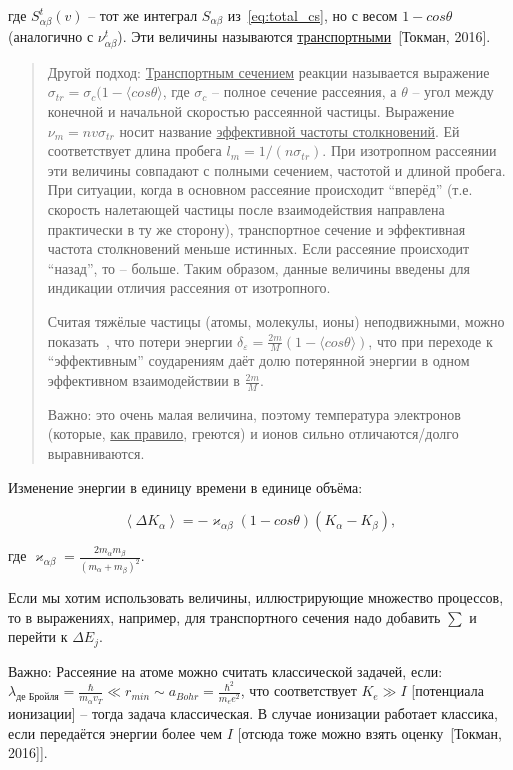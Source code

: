 \documentclass[10pt, a4paper]{article}
\newcommand{\Tokman}{~[Токман, 2016]}
\begin{document}
где $S_{\alpha\beta}^t(v)$ -- тот же интеграл $S_{\alpha\beta}$ из~\eqref{eq:total_cs}, но с весом $1-cos\theta$ (аналогично с $\nu_{\alpha\beta}^t$). Эти величины называются \uline{транспортными}\Tokman.

\begin{quotation}

Другой подход\cite{raizer}: \uline{Транспортным сечением} реакции называется выражение $\sigma_{tr} = \sigma_c(1-\langle {cos\theta}\rangle$, где $\sigma_c$ -- полное сечение рассеяния, а $\theta$ -- угол между конечной и начальной скоростью рассеянной частицы. Выражение $\nu_m = nv\sigma_{tr}$ носит название \uline{эффективной частоты столкновений}. Ей соответствует длина пробега $l_m = 1/(n\sigma_{tr})$. При изотропном рассеянии эти величины совпадают с полными сечением, частотой и длиной пробега. При ситуации, когда в основном рассеяние происходит ``вперёд'' (т.е. скорость налетающей частицы после взаимодействия направлена практически в ту же сторону), транспортное сечение и эффективная частота столкновений меньше истинных. Если рассеяние происходит ``назад'', то -- больше. Таким образом, данные величины введены для индикации отличия рассеяния от изотропного.

Считая тяжёлые частицы (атомы, молекулы, ионы) неподвижными, можно показать~\cite{raizer}, что потери энергии $\delta_\varepsilon = \frac{2m}{M}(1-\langle cos\theta\rangle)$, что при переходе к ``эффективным'' соударениям даёт долю потерянной энергии в одном эффективном взаимодействии в $\frac{2m}{M}$. 

Важно: это очень малая величина, поэтому температура электронов (которые, \uline{как правило}, греются) и ионов сильно отличаются/долго выравниваются.

\end{quotation}

Изменение энергии в единицу времени в единице объёма:

\begin{equation*}
	\left \langle \Delta K_\alpha \right \rangle = - \varkappa_{\alpha\beta} (1-cos\theta) (K_\alpha-K_\beta),
\end{equation*}

где $\varkappa_{\alpha\beta} = \frac{2m_\alpha m_\beta}{(m_\alpha+m_\beta)^2}$.

Если мы хотим использовать величины, иллюстрирующие множество процессов, то в выражениях, например, для транспортного сечения надо добавить $\sum$ и перейти к $\Delta E_j$. 

Важно: Рассеяние на атоме можно считать классической задачей, если: $\lambda_\text{де Бройля} = \frac{\hbar}{m_\alpha v_T} \ll r_{min} \sim a_{Bohr} = \frac{\hbar^2}{m_e e^2}$, что соответствует $K_e \gg I$ [потенциала ионизации] -- тогда задача классическая. В случае ионизации работает классика, если передаётся энергии более чем $I$ [отсюда тоже можно взять оценку\Tokman].
\end{document}
